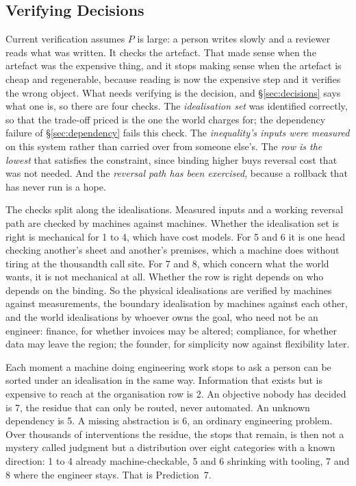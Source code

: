 \documentclass[11pt,oneside]{article}
\theoremstyle{definition}
\theoremstyle{remark}
\begin{document}
\subsection{Verifying Decisions}\label{sec:verification}

Current verification assumes $P$ is large: a person writes slowly and a reviewer reads what
was written. It checks the artefact. That made sense when the artefact was the expensive thing, and it
stops making sense when the artefact is cheap and regenerable, because reading is now the
expensive step and it verifies the wrong object. What needs verifying is the decision, and
\S\ref{sec:decisions} says what one is, so there are four checks. The \emph{idealisation set} was identified correctly, so that the trade-off
priced is the one the world charges for; the dependency failure of \S\ref{sec:dependency}
fails this check. The \emph{inequality's inputs were measured} on this system rather than
carried over from someone else's. The \emph{row is the lowest} that satisfies the
constraint, since binding higher buys reversal cost that was not needed. And the
\emph{reversal path has been exercised}, because a rollback that has never run is a hope.

The checks split along the idealisations. Measured inputs and a working reversal path are
checked by machines against machines. Whether the idealisation set is right is mechanical
for 1 to 4, which have cost models. For 5 and 6 it is one head checking another's sheet
and another's premises, which a machine does without tiring at the thousandth call site.
For 7 and 8, which concern what the world wants, it is not mechanical at all. Whether the
row is right depends on who depends on the binding. So the physical idealisations are
verified by machines against measurements, the boundary idealisation by machines against
each other, and the world idealisations by whoever owns the goal, who need not be an
engineer: finance, for whether invoices may be altered; compliance, for whether data may
leave the region; the founder, for simplicity now against flexibility later.  

Each moment a machine doing engineering work stops to ask a person can be sorted under
an idealisation in the same way. Information that exists but is expensive to reach
at the organisation row is 2. An objective nobody has decided is 7, the residue that can
only be routed, never automated. An unknown dependency is 5. A missing abstraction is 6,
an ordinary engineering problem. Over thousands of interventions the residue, the stops that remain, is then not a
mystery called judgment but a distribution over eight categories with a known direction:
1 to 4 already machine-checkable, 5 and 6 shrinking with tooling, 7 and 8 where the engineer stays. That is Prediction~7.
\end{document}
